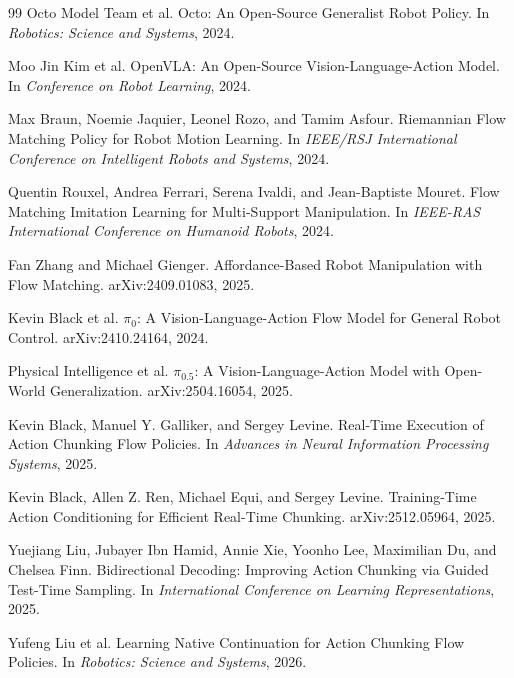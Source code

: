 \documentclass[10pt,twocolumn,letterpaper]{article}
\begin{document}
\begin{thebibliography}{99}
Octo Model Team et al.
\newblock Octo: An Open-Source Generalist Robot Policy.
\newblock In \emph{Robotics: Science and Systems}, 2024.

Moo Jin Kim et al.
\newblock OpenVLA: An Open-Source Vision-Language-Action Model.
\newblock In \emph{Conference on Robot Learning}, 2024.

Max Braun, Noemie Jaquier, Leonel Rozo, and Tamim Asfour.
\newblock Riemannian Flow Matching Policy for Robot Motion Learning.
\newblock In \emph{IEEE/RSJ International Conference on Intelligent Robots and
Systems}, 2024.

Quentin Rouxel, Andrea Ferrari, Serena Ivaldi, and Jean-Baptiste Mouret.
\newblock Flow Matching Imitation Learning for Multi-Support Manipulation.
\newblock In \emph{IEEE-RAS International Conference on Humanoid Robots}, 2024.

Fan Zhang and Michael Gienger.
\newblock Affordance-Based Robot Manipulation with Flow Matching.
\newblock arXiv:2409.01083, 2025.

Kevin Black et al.
\newblock $\pi_0$: A Vision-Language-Action Flow Model for General Robot Control.
\newblock arXiv:2410.24164, 2024.

Physical Intelligence et al.
\newblock $\pi_{0.5}$: A Vision-Language-Action Model with Open-World
Generalization.
\newblock arXiv:2504.16054, 2025.

Kevin Black, Manuel Y. Galliker, and Sergey Levine.
\newblock Real-Time Execution of Action Chunking Flow Policies.
\newblock In \emph{Advances in Neural Information Processing Systems}, 2025.

Kevin Black, Allen Z. Ren, Michael Equi, and Sergey Levine.
\newblock Training-Time Action Conditioning for Efficient Real-Time Chunking.
\newblock arXiv:2512.05964, 2025.

Yuejiang Liu, Jubayer Ibn Hamid, Annie Xie, Yoonho Lee, Maximilian Du, and Chelsea
Finn.
\newblock Bidirectional Decoding: Improving Action Chunking via Guided Test-Time
Sampling.
\newblock In \emph{International Conference on Learning Representations}, 2025.

Yufeng Liu et al.
\newblock Learning Native Continuation for Action Chunking Flow Policies.
\newblock In \emph{Robotics: Science and Systems}, 2026.


\end{thebibliography}
\end{document}
